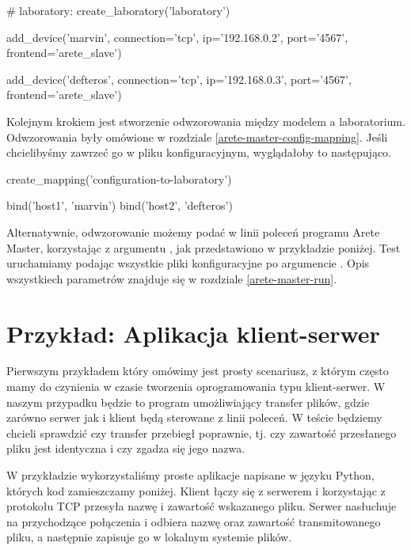 \documentclass[00-praca-magisterska.tex]{subfiles}
\begin{document}
\begin{pythoncode}
  # laboratory:
  create_laboratory('laboratory')

  add_device('marvin',
      connection='tcp',
      ip='192.168.0.2',
      port='4567',
      frontend='arete_slave')

  add_device('defteros',
      connection='tcp',
      ip='192.168.0.3',
      port='4567',
      frontend='arete_slave')
\end{pythoncode}

Kolejnym krokiem jest stworzenie odwzorowania między modelem a laboratorium.
Odwzorowania były omówione w rozdziale \ref{arete-master-config-mapping}. 
Jeśli chcielibyśmy zawrzeć go w pliku konfiguracyjnym, wyglądałoby to
następująco.

\begin{pythoncode}
  create_mapping('configuration-to-laboratory')

  bind('host1', 'marvin')
  bind('host2', 'defteros')
\end{pythoncode}

Alternatywnie, odwzorowanie możemy podać w linii poleceń programu Arete Master,
korzystając z argumentu , jak przedstawiono w przykładzie poniżej.
Test uruchamiamy podając wszystkie pliki konfiguracyjne po argumencie .
Opis wszystkiech parametrów znajduje się w rozdziale \ref{arete-master-run}.


\section{Przykład: Aplikacja klient-serwer}
\label{example-client-server}

Pierwszym przykładem który omówimy jest prosty scenariusz, z którym często mamy
do czynienia w czasie tworzenia oprogramowania typu klient-serwer. W naszym
przypadku będzie to program umożliwiający transfer plików, gdzie zarówno serwer
jak i klient będą sterowane z linii poleceń. W teście będziemy chcieli sprawdzić
czy transfer przebiegł poprawnie, tj. czy zawartość przesłanego pliku jest
identyczna i czy zgadza się jego nazwa.

W przykładzie wykorzystaliśmy proste aplikacje napisane w języku Python, których
kod zamieszczamy poniżej. Klient łączy się z serwerem i korzystając z protokołu
TCP przesyła nazwę i zawartość wskazanego pliku. Serwer nasłuchuje na
przychodzące połączenia i odbiera nazwę oraz zawartość transmitowanego pliku, a
następnie zapisuje go w lokalnym systemie plików.
\end{document}
